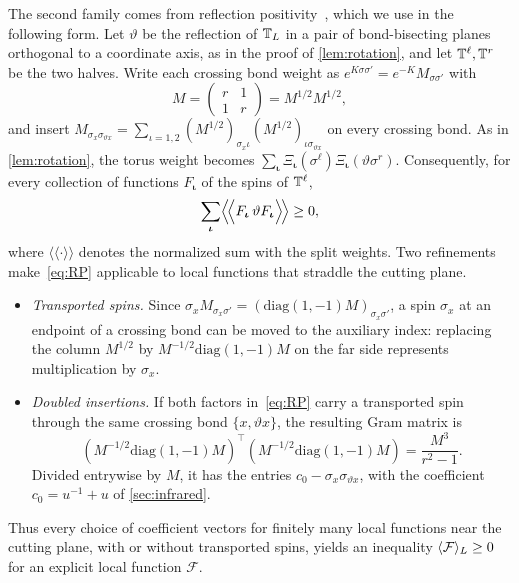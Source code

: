 The second family comes from reflection positivity~\cite{FILS78,Bis09}, which we use in the following form. Let $\vartheta$ be the reflection of $\mathbb T_L$ in a pair of bond-bisecting planes orthogonal to a coordinate axis, as in the proof of \cref{lem:rotation}, and let $\mathbb T^\ell,\mathbb T^r$ be the two halves. Write each crossing bond weight as $e^{K\sigma\sigma'}=e^{-K}M_{\sigma\sigma'}$ with
\[
 M=\begin{pmatrix}r&1\\1&r\end{pmatrix}=M^{1/2}M^{1/2},
\]
and insert $M_{\sigma_x\sigma_{\vartheta x}}=\sum_{\iota=1,2}(M^{1/2})_{\sigma_x\iota}(M^{1/2})_{\iota\sigma_{\vartheta x}}$ on every crossing bond. As in \cref{lem:rotation}, the torus weight becomes $\sum_{\boldsymbol\iota}\Xi_{\boldsymbol\iota}(\sigma^\ell)\Xi_{\boldsymbol\iota}(\vartheta\sigma^r)$. Consequently, for every collection of functions $F_{\boldsymbol\iota}$ of the spins of $\mathbb T^\ell$,
\begin{equation}\label{eq:RP}
 \sum_{\boldsymbol\iota}\Bigl\langle\!\Bigl\langle F_{\boldsymbol\iota}\,\vartheta F_{\boldsymbol\iota}\Bigr\rangle\!\Bigr\rangle\ge0,
\end{equation}
where $\langle\!\langle\cdot\rangle\!\rangle$ denotes the normalized sum with the split weights. Two refinements make~\eqref{eq:RP} applicable to local functions that straddle the cutting plane.
\begin{itemize}
\item \emph{Transported spins.} Since $\sigma_xM_{\sigma_x\sigma'}=(\mathrm{diag}(1,-1)M)_{\sigma_x\sigma'}$, a spin $\sigma_x$ at an endpoint of a crossing bond can be moved to the auxiliary index: replacing the column $M^{1/2}$ by $M^{-1/2}\mathrm{diag}(1,-1)M$ on the far side represents multiplication by $\sigma_x$.
\item \emph{Doubled insertions.} If both factors in~\eqref{eq:RP} carry a transported spin through the same crossing bond $\{x,\vartheta x\}$, the resulting Gram matrix is
\[
 (M^{-1/2}\mathrm{diag}(1,-1)M)^{\!\top}(M^{-1/2}\mathrm{diag}(1,-1)M)=\frac{M^3}{r^2-1}.
\]
Divided entrywise by $M$, it has the entries $c_0-\sigma_x\sigma_{\vartheta x}$, with the coefficient $c_0=u^{-1}+u$ of \cref{sec:infrared}.
\end{itemize}
Thus every choice of coefficient vectors for finitely many local functions near the cutting plane, with or without transported spins, yields an inequality $\langle \mathcal F\rangle_L\ge0$ for an explicit local function $\mathcal F$.

